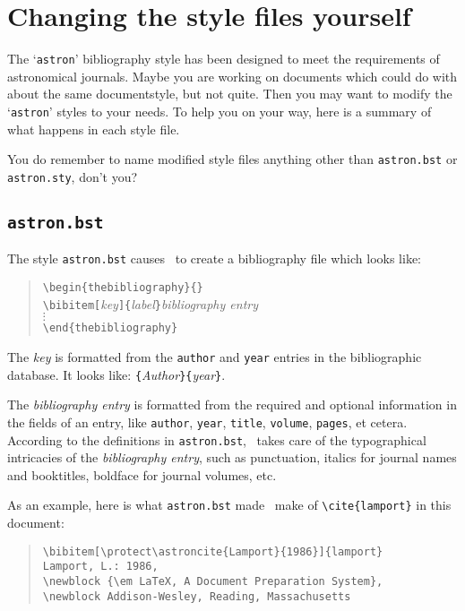 \newpage
\section{Changing the style files yourself}

The `{\tt astron}' bibliography style has been designed to meet the
requirements of astronomical journals.
Maybe you are working on documents which could do with about the same
documentstyle, but not quite.
Then you may want to modify the `{\tt astron}' styles to your needs.
To help you on your way, here is a summary of what happens in each style
file.

You do remember to name modified style files anything other than
{\tt astron.bst} or {\tt astron.sty}, don't you?

\subsection{{\tt astron.bst}}

The style {\tt astron.bst} causes \BibTeX\ to create a bibliography file
which looks like:
%
\begin{quotation}
\noindent \verb|\begin{thebibliography}{}| \\
\verb|\bibitem[|{\it key}\verb|]{|{\it label}\verb|}|{\it bibliography entry} \\
\indent $\vdots$ \\
\verb|\end{thebibliography}|
\end{quotation}
%
The {\it key\/} is formatted from the {\tt author} and {\tt year} entries
in the bibliographic database.
It looks like: \verb|{|{\it Author\/}\verb|}{|{\it year\/}\verb|}|.

The {\it bibliography entry\/} is formatted from the required and optional
information in the fields of an entry, like {\tt author}, {\tt year},
{\tt title}, {\tt volume}, {\tt pages}, et cetera.
According to the definitions in {\tt astron.bst}, \BibTeX\ takes care of
the typographical intricacies of the {\it bibliography entry}, such
as punctuation, italics for journal names and booktitles, boldface for
journal volumes, etc.

As an example, here is what {\tt astron.bst} made \BibTeX\ make of
\verb|\cite{lamport}| in this document:
%
\begin{quotation}
\noindent\begin{verbatim}
\bibitem[\protect\astroncite{Lamport}{1986}]{lamport}
Lamport, L.: 1986,
\newblock {\em LaTeX, A Document Preparation System},
\newblock Addison-Wesley, Reading, Massachusetts
\end{verbatim}
\end{quotation}

